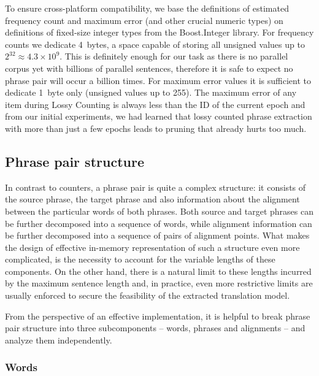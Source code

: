 To ensure cross-platform compatibility, we base the definitions of estimated frequency count and
maximum error (and other crucial numeric types) on definitions of fixed-size integer types from
the Boost.Integer library.
For frequency counts we dedicate 4~bytes, a space capable of storing all unsigned values up to
$2^{32} \approx 4.3 \times 10^9$. This is definitely enough for our task as there is no
parallel corpus yet with billions of parallel sentences, therefore it is safe to expect no phrase
pair will occur a billion times.
For maximum error values it is sufficient to dedicate 1~byte only (unsigned values up to 255).
The maximum error of any item during Lossy Counting is always less than the ID of the current epoch and
from our initial experiments, we had learned that lossy counted phrase extraction with more than just
a few epochs leads to pruning that already hurts too much.

\subsection{Phrase pair structure}


In contrast to counters, a phrase pair is quite a complex structure: it consists of the source phrase,
the target phrase and also information about the alignment between the particular words of both phrases.
Both source and target phrases can be further decomposed into a sequence of words, while alignment
information can be further decomposed into a sequence of pairs of alignment points.
What makes the design of effective in-memory representation of such a structure even more complicated,
is the necessity to account for the variable lengths of these components.
On the other hand, there is a natural limit to these lengths incurred by the maximum sentence length and,
in practice, even more restrictive limits are usually enforced to secure the feasibility of the
extracted translation model.

From the perspective of an effective implementation, it is helpful to break phrase pair
structure into three subcomponents -- words, phrases and alignments -- and analyze them
independently.

\subsubsection*{Words}

